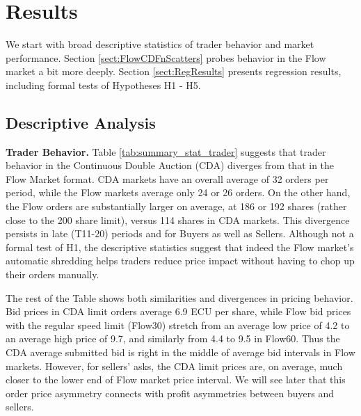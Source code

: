 \documentclass[12pt]{article}
\begin{document}
\begin{table}[t]
{\begin{threeparttable}
\begin{tablenotes}
\end{tablenotes}
\end{threeparttable}
}
\end{table}

\vspace{-.15in}
\section{Results} \label{results}
\vspace{-.15in}
We start with broad descriptive statistics of trader behavior and market performance. Section \ref{sect:FlowCDFnScatters} probes behavior in the Flow market a bit more deeply.
Section \ref{sect:RegResults} presents regression results, including formal tests of Hypotheses H1 - H5.

\subsection{Descriptive Analysis}

\noindent \textbf{Trader Behavior.} 
Table \ref{tab:summary_stat_trader} suggests that trader behavior in the Continuous Double Auction (CDA) 
diverges from that in the Flow Market format. 
CDA markets have an overall average of 32 orders per period, while the Flow markets average only 24 or 26 orders. 
On the other hand, the Flow orders are substantially larger on average, at 186 or 192 shares 
(rather close to the 200 share limit), versus 114 shares in CDA markets. This divergence persists in  late (T11-20) periods and for Buyers as well as Sellers. Although not a formal test of H1, the descriptive statistics suggest that indeed the Flow market's automatic shredding helps traders reduce price impact without having to chop up their orders manually.  

The rest of the Table shows both similarities and divergences in pricing behavior. 
Bid prices in CDA limit orders average 6.9 ECU per share, while Flow bid prices with the regular speed limit (Flow30) stretch from an average low price of 4.2 to an average high price of 9.7,
and similarly from 4.4 to 9.5 in Flow60.  
Thus the CDA average submitted bid is right in the middle of average bid intervals in Flow markets. However, for sellers' asks, the CDA limit prices are, on average, much closer to the lower end of Flow market price interval.  
We will see later that this order price asymmetry connects with profit asymmetries between buyers and sellers. 
\end{document}
